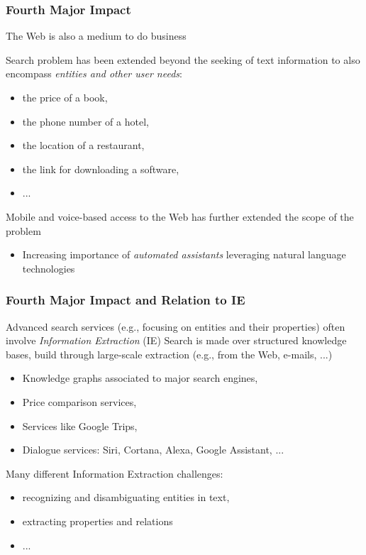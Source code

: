 \documentclass[svgnames]{beamer}
\begin{document}
\begin{frame}
    \frametitle{Fourth Major Impact}

    The Web is also a medium to do business
    \vfill

    Search problem has been extended beyond the seeking of text information to also encompass \emph{entities and other user needs}:
    \begin{itemize}
    \item the price of a book, 
    \item the phone number of a hotel,
    \item the location of a restaurant,
    \item the link for downloading a software,
    \item ...
    \end{itemize}
    \vfill
    Mobile and voice-based access to the Web has further extended the scope of the problem
    \begin{itemize}
    \item Increasing importance of \emph{automated assistants} leveraging natural language technologies
    \end{itemize}
\end{frame}

\begin{frame}
    \frametitle{Fourth Major Impact and Relation to IE}
    Advanced search services (e.g., focusing on entities and their properties) often involve \emph{Information Extraction} (IE)
    \vfill
    Search is made over structured knowledge bases, build through large-scale extraction (e.g., from the Web, e-mails, ...)
    \begin{itemize}
    \item Knowledge graphs associated to major search engines,
    \item Price comparison services,
    \item Services like Google Trips,
    \item Dialogue services: Siri, Cortana, Alexa, Google Assistant, ...
    \end{itemize}
    \vfill
    Many different Information Extraction challenges:
    \begin{itemize}
    \item recognizing and disambiguating entities in text,
    \item extracting properties and relations
    \item ...
    \end{itemize}
\end{frame}
\end{document}
